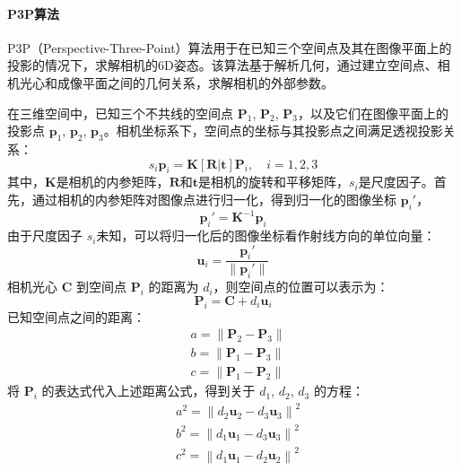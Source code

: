 \paragraph{P3P算法}

P3P（Perspective-Three-Point）算法\cite{p3p}用于在已知三个空间点及其在图像平面上的投影的情况下，求解相机的6D姿态。该算法基于解析几何，通过建立空间点、相机光心和成像平面之间的几何关系，求解相机的外部参数。

在三维空间中，已知三个不共线的空间点 $\mathbf{P}_1$, $\mathbf{P}_2$, $\mathbf{P}_3$，以及它们在图像平面上的投影点 $\mathbf{p}_1$, $\mathbf{p}_2$, $\mathbf{p}_3$。相机坐标系下，空间点的坐标与其投影点之间满足透视投影关系：
\begin{equation}
	s_i \mathbf{p}_i = \mathbf{K} [\mathbf{R} | \mathbf{t}] \mathbf{P}_i, \quad i = 1,2,3
\end{equation}
其中，$\mathbf{K}$是相机的内参矩阵，$\mathbf{R}$和$\mathbf{t}$是相机的旋转和平移矩阵，$s_i$是尺度因子。首先，通过相机的内参矩阵对图像点进行归一化，得到归一化的图像坐标 $\mathbf{p}_i'$，
\begin{equation}
	\mathbf{p}_i' = \mathbf{K}^{-1} \mathbf{p}_i
\end{equation}
由于尺度因子 $s_i$未知，可以将归一化后的图像坐标看作射线方向的单位向量：
\begin{equation}
	\mathbf{u}_i = \frac{\mathbf{p}_i'}{\|\mathbf{p}_i'\|}
\end{equation}
相机光心 $\mathbf{C}$ 到空间点 $\mathbf{P}_i$ 的距离为 $d_i$，则空间点的位置可以表示为：
\begin{equation}
	\mathbf{P}_i = \mathbf{C} + d_i \mathbf{u}_i
\end{equation}
已知空间点之间的距离：
\begin{equation}
	\begin{aligned}
		& a = \|\mathbf{P}_2 - \mathbf{P}_3\| \\
		& b = \|\mathbf{P}_1 - \mathbf{P}_3\| \\
		& c = \|\mathbf{P}_1 - \mathbf{P}_2\|
	\end{aligned}
\end{equation}
将 $\mathbf{P}_i$ 的表达式代入上述距离公式，得到关于 $d_1$, $d_2$, $d_3$ 的方程：
\begin{equation}
	\begin{aligned}
		& a^2 = \left\| d_2 \mathbf{u}_2 - d_3 \mathbf{u}_3 \right\|^2 \\
		& b^2 = \left\| d_1 \mathbf{u}_1 - d_3 \mathbf{u}_3 \right\|^2 \\
		& c^2 = \left\| d_1 \mathbf{u}_1 - d_2 \mathbf{u}_2 \right\|^2
	\end{aligned}
\end{equation}
